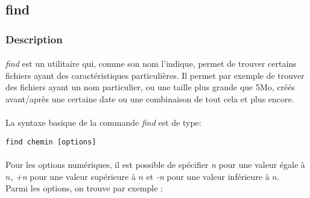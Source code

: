 \subsection*{find}
\subsubsection*{Description}

\paragraph{}
\emph{find} est un utilitaire qui, comme son nom l'indique, permet de trouver
certains fichiers ayant des caractéristiques particulières. Il permet par
exemple de trouver des fichiers ayant un nom particulier, ou une taille plus
grande que 5Mo, créés avant/après une certaine date ou une combinaison de tout
cela et plus encore.

\paragraph{}
La syntaxe basique de la commande \emph{find} est de type:
\begin{lstlisting}
find chemin [options]
\end{lstlisting}

\paragraph{}
Pour les options numériques, il est possible de spécifier \textit{n} pour une
valeur égale à $n$, \textit{+n} pour une valeur supérieure à $n$ et
\textit{-n} pour une valeur inférieure à $n$.\\

Parmi les options, on trouve par exemple :

